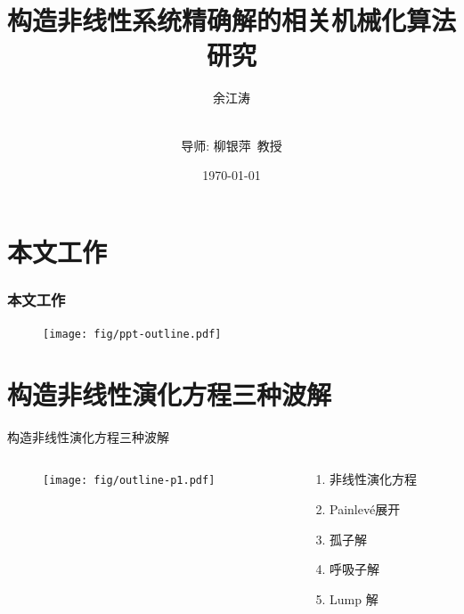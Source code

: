 \documentclass[handout]{beamer}
\title[华东师范大学硕士学位论文]{构造非线性系统精确解的相关机械化算法研究}
\author[余江涛]{余江涛 \and \\导师: 柳银萍~教授}
\date{\today}
\newcommand{\Painleve}{Painlev{\'e}}
\begin{document}

\section{本文工作}
\begin{frame}
\frametitle{本文工作}
\begin{figure}
\centering
\texttt{[image: fig/ppt-outline.pdf]} 
\end{figure}
\end{frame}

\section{构造非线性演化方程三种波解}
\begin{frame}{构造非线性演化方程三种波解}
\begin{columns}
\begin{column}{0.5\textwidth}
  \begin{figure}
    \centering
    \texttt{[image: fig/outline-p1.pdf]}
  \end{figure}
\end{column}
\begin{column}{0.5\textwidth}
  \begin{enumerate}
  \item 非线性演化方程
  \item \Painleve{}展开
  \item 孤子解
  \item 呼吸子解 
  \item Lump 解
  \end{enumerate}
\end{column}
\end{columns}
\end{frame}
\end{document}
